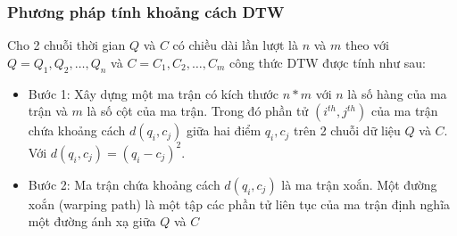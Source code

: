 \documentclass[13pt,oneside]{scrbook}
\begin{document}
\subsubsection{Phương pháp tính khoảng cách DTW}
Cho 2 chuỗi thời gian $Q$ và $C$ có chiều dài lần lượt là $n$ và $m$ theo với $Q = Q_1, Q_2, …, Q_n$ và $C = C_1, C_2, …, C_m$ công thức DTW được tính như sau:
\begin{itemize}
\item Bước 1: Xây dựng một ma trận có kích thước $n*m$ với $n$ là số hàng của ma trận và $m$ là số cột của ma trận. 
Trong đó phần tử $(i^{th},j^{th})$ của ma trận chứa khoảng cách $d(q_i, c_j)$ giữa hai điểm $q_i, c_j$ trên 2 chuỗi dữ liệu $Q$ và $C$. Với $d(q_i, c_j) = (q_i - c_j)^2$.
\item Bước 2: Ma trận chứa khoảng cách $d(q_i, c_j)$ là ma trận xoắn. 
Một đường xoắn (warping path) là một tập các phần tử liên tục của ma trận định nghĩa một đường ánh xạ giữa $Q$ và $C$


\end{itemize}
\end{document}
